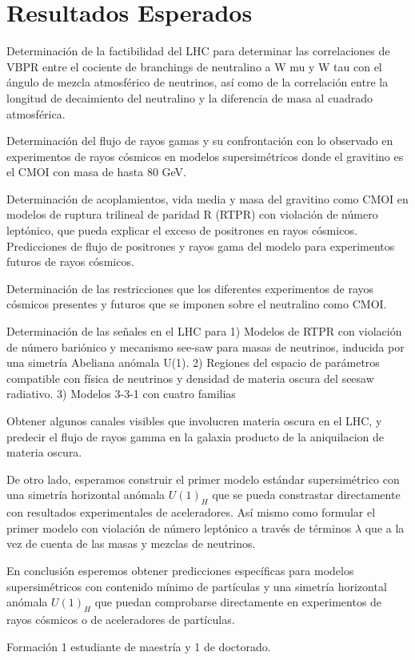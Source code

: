 \section{ Resultados Esperados }

Determinación de la factibilidad del LHC para determinar las correlaciones de VBPR entre el cociente de branchings de neutralino a W mu y W tau con el ángulo de mezcla atmosférico de neutrinos, así como de la correlación entre la longitud de decaimiento del neutralino y la diferencia de masa al cuadrado atmosférica.

Determinación del flujo de rayos gamas y su confrontación con lo observado en experimentos de rayos cósmicos en modelos supersimétricos donde el gravitino es el CMOI con masa de hasta 80 GeV. 

Determinación de acoplamientos, vida media y masa del gravitino como CMOI en modelos de ruptura trilineal de paridad R (RTPR) con violación de número leptónico, que pueda explicar el exceso de positrones en rayos cósmicos. Predicciones de flujo de positrones y rayos gama del modelo para experimentos futuros de rayos cósmicos. 

Determinación de las restricciones que los diferentes experimentos de rayos cósmicos 
presentes y futuros que se imponen sobre el neutralino como CMOI. 

Determinación de las señales en el LHC para 1) Modelos de RTPR con violación de número bariónico y mecanismo see-saw para masas de neutrinos, inducida por una simetría Abeliana anómala U(1). 2) Regiones del espacio de parámetros compatible con física de neutrinos y densidad de materia oscura del seesaw radiativo. 3) Modelos 3-3-1 con cuatro familias

 Obtener algunos canales visibles que involucren materia oscura en el LHC, y predecir el flujo de rayos gamma en la galaxia producto de la aniquilacion de materia oscura.

De otro lado, esperamos construir el primer modelo estándar supersimétrico con una simetría horizontal anómala $U(1)_H$ que se pueda constrastar directamente con resultados experimentales de aceleradores. Así mismo como formular el primer modelo con violación de número leptónico a través de términos $\lambda$ que a la vez de cuenta de las masas y mezclas de neutrinos.

En conclusión esperemos obtener predicciones específicas para modelos supersimétricos con contenido mínimo de partículas y una simetría horizontal anómala $U(1)_H$ que puedan comprobarse directamente en experimentos de rayos cósmicos o de aceleradores de partículas.

Formación 1 estudiante de maestría y 1 de doctorado.



